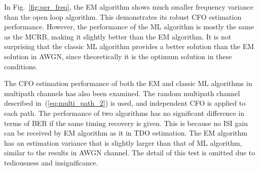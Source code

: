 \documentclass[journal,comsoc]{IEEEtran}
\begin{document}
In Fig.~\ref{fig:per_freq}, the EM algorithm shows much smaller frequency variance than the open loop algorithm. 
This demonstrates its robust CFO estimation performance.
However, the performance of the ML algorithm is mostly the same as the MCRB, making it slightly better than the EM algorithm.
It is not surprising that the classic ML algorithm provides a better solution than the EM solution in AWGN, since theoretically it is the optimum solution in these conditions. 

The CFO estimation performance of both the EM and classic ML algorithms in multipath channels has also been examined.
The random multipath channel described in~(\ref{eq:multi_path_2}) is used,
and independent CFO is applied to each path.
The performance of two algorithms has no significant difference in terms of BER if the same timing recovery is given.
This is because no ISI gain can be received by EM algorithm as it in TDO estimation.
The EM algorithm has an estimation variance that is slightly larger than that of ML algorithm, similar to the results in AWGN channel.
The detail of this test is omitted due to tediousness and insignificance.  
% 
% 
\end{document}
